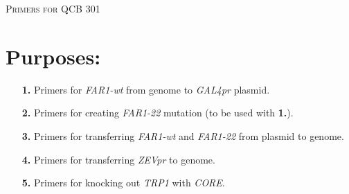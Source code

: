 \documentclass[landscape,a4paper]{article}
\date{\today} %
\begin{document}
\noindent
{} %
 
\begin{center}
\textsc{\LARGE Primers for QCB 301}\\ %
\end{center}

\section*{Purposes:}
\begin{itemize}
    \item[\textbf{1.}] Primers for \emph{FAR1-wt} from genome to \emph{GAL4pr} plasmid.
    \item[\textbf{2.}] Primers for creating \emph{FAR1-22} mutation (to be used with \textbf{1.}).
    \item[\textbf{3.}] Primers for transferring \emph{FAR1-wt} and \emph{FAR1-22} from plasmid to genome.
    \item[\textbf{4.}] Primers for transferring \emph{ZEVpr} to genome.
    \item[\textbf{5.}] Primers for knocking out \emph{TRP1} with \emph{CORE}.
\end{itemize}
\end{document}
